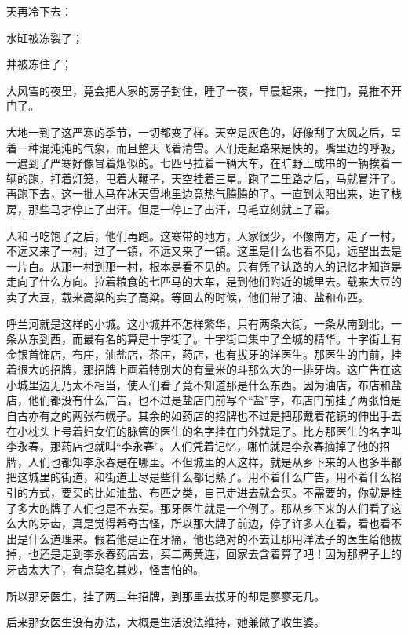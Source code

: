 \par 天再冷下去：
\par 水缸被冻裂了；
\par 井被冻住了；
\par 大风雪的夜里，竟会把人家的房子封住，睡了一夜，早晨起来，一推门，竟推不开门了。
\par 大地一到了这严寒的季节，一切都变了样。天空是灰色的，好像刮了大风之后，呈着一种混沌沌的气象，而且整天飞着清雪。人们走起路来是快的，嘴里边的呼吸，一遇到了严寒好像冒着烟似的。七匹马拉着一辆大车，在旷野上成串的一辆挨着一辆的跑，打着灯笼，甩着大鞭子，天空挂着三星。跑了二里路之后，马就冒汗了。再跑下去，这一批人马在冰天雪地里边竟热气腾腾的了。一直到太阳出来，进了栈房，那些马才停止了出汗。但是一停止了出汗，马毛立刻就上了霜。
\par 人和马吃饱了之后，他们再跑。这寒带的地方，人家很少，不像南方，走了一村，不远又来了一村，过了一镇，不远又来了一镇。这里是什么也看不见，远望出去是一片白。从那一村到那一村，根本是看不见的。只有凭了认路的人的记忆才知道是走向了什么方向。拉着粮食的七匹马的大车，是到他们附近的城里去。载来大豆的卖了大豆，载来高粱的卖了高粱。等回去的时候，他们带了油、盐和布匹。
\par 呼兰河就是这样的小城。这小城并不怎样繁华，只有两条大街，一条从南到北，一条从东到西，而最有名的算是十字街了。十字街口集中了全城的精华。十字街上有金银首饰店，布庄，油盐店，茶庄，药店，也有拔牙的洋医生。那医生的门前，挂着很大的招牌，那招牌上画着特别大的有量米的斗那么大的一排牙齿。这广告在这小城里边无乃太不相当，使人们看了竟不知道那是什么东西。因为油店，布店和盐店，他们都没有什么广告，也不过是盐店门前写个“盐”字，布店门前挂了两张怕是自古亦有之的两张布幌子。其余的如药店的招牌也不过是把那戴着花镜的伸出手去在小枕头上号着妇女们的脉管的医生的名字挂在门外就是了。比方那医生的名字叫李永春，那药店也就叫“李永春”。人们凭着记忆，哪怕就是李永春摘掉了他的招牌，人们也都知李永春是在哪里。不但城里的人这样，就是从乡下来的人也多半都把这城里的街道，和街道上尽是些什么都记熟了。用不着什么广告，用不着什么招引的方式，要买的比如油盐、布匹之类，自己走进去就会买。不需要的，你就是挂了多大的牌子人们也是不去买。那牙医生就是一个例子。那从乡下来的人们看了这么大的牙齿，真是觉得希奇古怪，所以那大牌子前边，停了许多人在看，看也看不出是什么道理来。假若他是正在牙痛，他也绝对的不去让那用洋法子的医生给他拔掉，也还是走到李永春药店去，买二两黄连，回家去含着算了吧！因为那牌子上的牙齿太大了，有点莫名其妙，怪害怕的。
\par 所以那牙医生，挂了两三年招牌，到那里去拔牙的却是寥寥无几。
\par 后来那女医生没有办法，大概是生活没法维持，她兼做了收生婆。
